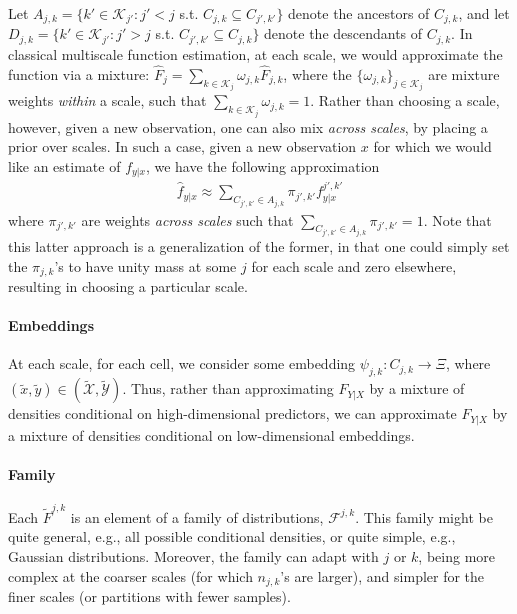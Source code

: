 \documentclass{article} %
\providecommand{\mh}[1]{\hat{#1}}
\providecommand{\mc}[1]{\mathcal{#1}}
\providecommand{\mt}[1]{\widetilde{#1}}
\newcommand{\from}{{\ensuremath{\colon}}}  %
\newcommand{\ZZ}{\mathbb{Z}}
\providecommand{\mtc}[1]{\widetilde{\mathcal{#1}}}
\begin{document}
Let $A_{j,k}=\{k' \in \mc{K}_{j'} : j' < j$ s.t. $C_{j,k} \subseteq C_{j',k'}\}$ denote the ancestors of $C_{j,k}$, and let $D_{j,k}=\{k' \in \mc{K}_{j'} : j' > j$ s.t. $C_{j',k'} \subseteq C_{j,k}\}$ denote the descendants of $C_{j,k}$.
In classical multiscale function estimation, at each scale, we would approximate the function via a mixture: $\mh{F}_j = \sum_{k \in \mc{K}_j} \omega_{j,k} \mh{F}_{j,k}$, where the $\{\omega_{j,k}\}_{j \in \mc{K}_j}$ are mixture weights \emph{within} a scale, such that $\sum_{k \in \mc{K}_j} \omega_{j,k}=1$.  Rather than choosing a scale, however, given a new observation, one can also mix \emph{across scales},  by placing a prior over scales.  In such a case, given a new observation $x$ for which we would like an estimate of $f_{y|x}$, we have the following approximation 
\begin{align}
\mh{f}_{y|x} \approx \sum_{C_{j',k'} \in A_{j,k}} \pi_{j',k'} f^{j',k'}_{y|x}	
\end{align}
where $\pi_{j',k'}$ are weights \emph{across scales} such that $\sum_{C_{j',k'} \in A_{j,k}} \pi_{j',k'}=1$.  Note that this latter approach is a generalization of the former, in that one could simply set the $\pi_{j,k}$'s to have unity mass at some $j$ for each scale and zero elsewhere, resulting in choosing a particular scale.

 

\paragraph{Embeddings}
At each scale, for each cell, we consider some embedding $\psi_{j,k} \from C_{j,k} \to \Xi$, where $(\mt{x},\mt{y}) \in (\mtc{X}, \mtc{Y})$.  Thus, rather than approximating $F_{Y|X}$ by a mixture of densities conditional on high-dimensional predictors, we can approximate $F_{Y|X}$ by a mixture of densities conditional on low-dimensional embeddings. %

\paragraph{Family} Each $\mt{F}^{j,k}$ is an element of a family of distributions, $\mc{F}^{j,k}$.  This family might be quite general, e.g., all possible conditional densities, or quite simple, e.g., Gaussian distributions.  Moreover, the family can adapt with $j$ or $k$, being more complex at the coarser scales (for which $n_{j,k}$'s are larger), and simpler for the finer scales (or partitions with fewer samples).
\end{document}
